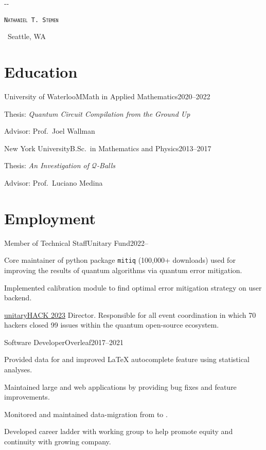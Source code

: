 \documentclass{cultvoucher}
\begin{document}
\begin{adjustwidth}{\dimexpr-\marginparsep-\marginparwidth}{}
	\begin{center}
		\textsc{\texttt{\HUGE Nathaniel T. Stemen}}

		 \separator{}\, Seattle, WA
	\end{center}
\end{adjustwidth}

\section{Education}

\begin{entry}{University of Waterloo}{MMath in Applied Mathematics}{2020--2022}
	\item Thesis: \textit{Quantum Circuit Compilation from the Ground Up}
	\item Advisor: Prof.\ Joel Wallman
\end{entry}

\begin{entry}{New York University}{B.Sc.\ in Mathematics and Physics}{2013--2017}
	\item Thesis: \textit{An Investigation of $\mathcal{Q}$-Balls}
	\item Advisor: Prof.\ Luciano Medina
\end{entry}

\section{Employment}

\begin{entry}{Member of Technical Staff}{Unitary Fund}{2022--}
	\item Core maintainer of python package \texttt{mitiq} (100,000+ downloads) used for improving the results of quantum algorithms via quantum error mitigation.
	\item Implemented calibration module to find optimal error mitigation strategy on user backend.
	\item \href{https://unitaryhack.dev/}{unitaryHACK 2023} Director. Responsible for all event coordination in which 70 hackers closed 99 issues within the quantum open-source ecosystem.
\end{entry}

\begin{entry}{Software Developer}{Overleaf}{2017--2021}
	\item Provided data for and improved \LaTeX{} autocomplete feature using statistical analyses.
	\item Maintained large  and  web applications by providing bug fixes and feature improvements.
	\item Monitored and maintained data-migration from  to .
	\item Developed career ladder with working group to help promote equity and continuity with growing company.
\end{entry}
\end{document}
